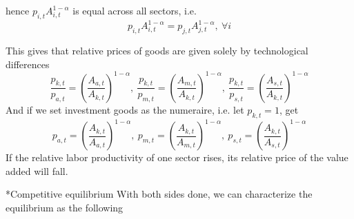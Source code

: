 \documentclass[10pt,landscape,a4paper]{article}
\makeatletter
\renewcommand{\subsection}{\@startsection{subsection}{1}{0mm}{.2ex}{.2ex}{\small\bfseries}}
\makeatother
\begin{document}
\begin{multicols*}{3}
hence $p_{i,t}A_{i,t}^{1-\alpha}$ is equal across all sectors, i.e. 
$$p_{i,t}A_{i,t}^{1-\alpha}=p_{j,t}A_{j,t}^{1-\alpha},\ \forall i$$

This gives that relative prices of goods are given solely by technological differences
$$
\frac{p_{k,t}}{p_{a,t}}=\left(\frac{A_{a,t}}{A_{k,t}}\right)^{1-\alpha},\ \frac{p_{k,t}}{p_{m,t}}=\left(\frac{A_{m,t}}{A_{k,t}}\right)^{1-\alpha},\ \frac{p_{k,t}}{p_{s,t}}=\left(\frac{A_{s,t}}{A_{k,t}}\right)^{1-\alpha}
$$
And if we set investment goods as the numeraire, i.e. let $p_{k,t}=1$, get
$$
p_{a,t} = \left(\frac{A_{k,t}}{A_{a,t}}\right)^{1-\alpha},\ p_{m,t} = \left(\frac{A_{k,t}}{A_{m,t}}\right)^{1-\alpha},\ p_{s,t} = \left(\frac{A_{k,t}}{A_{s,t}}\right)^{1-\alpha}
$$
If the relative labor productivity of one sector rises, its relative price of the value added will fall.

\subsection*{Competitive equilibrium}
With both sides done, we can characterize the equilibrium as the following

\vspace{2pt}


\end{multicols*}
\end{document}
